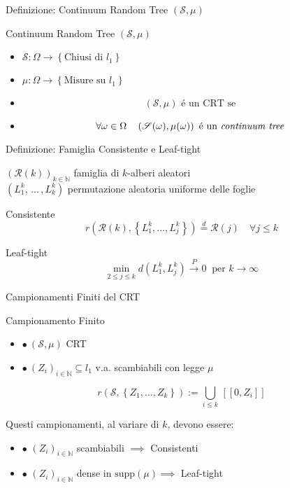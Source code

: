 \documentclass{beamer}
\newcommand{\Ss}{\mathscr{S}}
\theoremstyle{definition}
\theoremstyle{plain}
\theoremstyle{remark}
\begin{document}
\begin{frame}{Definizione: Continuum Random Tree $(\Ss, \mu)$}
\begin{block}{Continuum Random Tree $(\Ss, \mu)$}
\begin{itemize}
\item $\Ss: \Omega \longrightarrow \left\{\text{Chiusi di }l_1\right\}$
\item $\mu: \Omega \longrightarrow \left\{\text{Misure su }l_1\right\}$
\item $$\left(\mathscr{S}, \mu\right) \text{ \'e un CRT se}$$
\item $$\forall \omega \in \Omega \quad \left(\mathscr{S}(\omega), \mu(\omega)\right) \text{ \'e un \textit{continuum tree}}$$
\end{itemize}
\end{block}
\end{frame}
\begin{frame}{Definizione: Famiglia Consistente e Leaf-tight}
\begin{center}
$\left(\mathscr{R}(k)\right)_{k\in\mathbb{N}}$ famiglia di $k$-alberi aleatori\\
\bigskip
$\left(L^k_1, \, \dots \, ,L^k_k\right)$ permutazione aleatoria uniforme delle foglie
\end{center}
\pause
\begin{block}{Consistente}
$$r\left(\mathscr{R}(k), \left\{L^k_1, \dots ,L^k_j\right\}\right)\stackrel{d}{=}\mathscr{R}(j) \quad \forall j\leq k$$
\end{block}
\pause
\begin{block}{Leaf-tight}
$$\min\limits_{2\leq j \leq k} d\left(L^k_1, L^k_j\right)\xrightarrow{P}0 \ \text{ per } k\to\infty$$
\end{block}
\end{frame}

\begin{frame}{Campionamenti Finiti del CRT}

\begin{block}{Campionamento Finito}
\vspace{0.1cm}
\begin{itemize}
\item $\bullet \ \left(\mathscr{S}, \mu\right)$ CRT
\item $\bullet \ \left(Z_i\right)_{i\in\mathbb{N}}\subseteq l_1$ v.a. scambiabili con legge $\mu$
\end{itemize}
$$r\left(\mathscr{S}, \left\{Z_1, \dots ,Z_k\right\}\right):=\bigcup\limits_{i\leq k}\, [[0,Z_i]]$$
\end{block}
\bigskip
\pause
Questi campionamenti, al variare di $k$, devono essere:
\bigskip
\begin{itemize}
\item $\bullet$ $(Z_i)_{i\in\mathbb{N}}$ scambiabili $\implies$ Consistenti
\bigskip
\item $\bullet$ $(Z_i)_{i\in\mathbb{N}}$ dense in $\mathrm{supp}(\mu)\implies$ Leaf-tight 
\end{itemize}
\end{frame}
\end{document}
